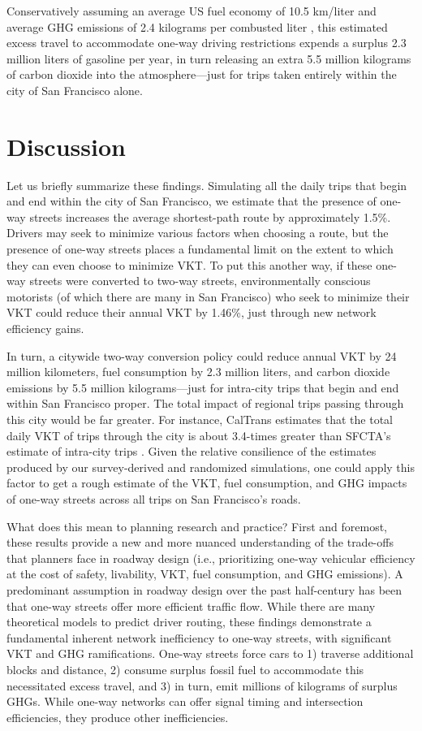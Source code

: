 \documentclass{trbunofficial}
\begin{document}
Conservatively assuming an average US fuel economy of 10.5 km/liter \cite{shepherdson_u.s._2018} and average GHG emissions of 2.4 kilograms per combusted liter \cite{us_department_of_energy_how_2018}, this estimated excess travel to accommodate one-way driving restrictions expends a surplus 2.3 million liters of gasoline per year, in turn releasing an extra 5.5 million kilograms of carbon dioxide into the atmosphere---just for trips taken entirely within the city of San Francisco alone.


\section{Discussion}

Let us briefly summarize these findings. Simulating all the daily trips that begin and end within the city of San Francisco, we estimate that the presence of one-way streets increases the average shortest-path route by approximately 1.5\%. Drivers may seek to minimize various factors when choosing a route, but the presence of one-way streets places a fundamental limit on the extent to which they can even choose to minimize VKT. To put this another way, if these one-way streets were converted to two-way streets, environmentally conscious motorists (of which there are many in San Francisco) who seek to minimize their VKT could reduce their annual VKT by 1.46\%, just through new network efficiency gains.

In turn, a citywide two-way conversion policy could reduce annual VKT by 24 million kilometers, fuel consumption by 2.3 million liters, and carbon dioxide emissions by 5.5 million kilograms---just for intra-city trips that begin and end within San Francisco proper. The total impact of regional trips passing through this city would be far greater. For instance, CalTrans estimates that the total daily VKT of trips through the city is about 3.4-times greater than SFCTA's estimate of intra-city trips \cite{caltrans_2017_2018}. Given the relative consilience of the estimates produced by our survey-derived and randomized simulations, one could apply this factor to get a rough estimate of the VKT, fuel consumption, and GHG impacts of one-way streets across all trips on San Francisco's roads.

What does this mean to planning research and practice? First and foremost, these results provide a new and more nuanced understanding of the trade-offs that planners face in roadway design (i.e., prioritizing one-way vehicular efficiency at the cost of safety, livability, VKT, fuel consumption, and GHG emissions). A predominant assumption in roadway design over the past half-century has been that one-way streets offer more efficient traffic flow. While there are many theoretical models to predict driver routing, these findings demonstrate a fundamental inherent network inefficiency to one-way streets, with significant VKT and GHG ramifications. One-way streets force cars to 1) traverse additional blocks and distance, 2) consume surplus fossil fuel to accommodate this necessitated excess travel, and 3) in turn, emit millions of kilograms of surplus GHGs. While one-way networks can offer signal timing and intersection efficiencies, they produce other inefficiencies.
\end{document}
